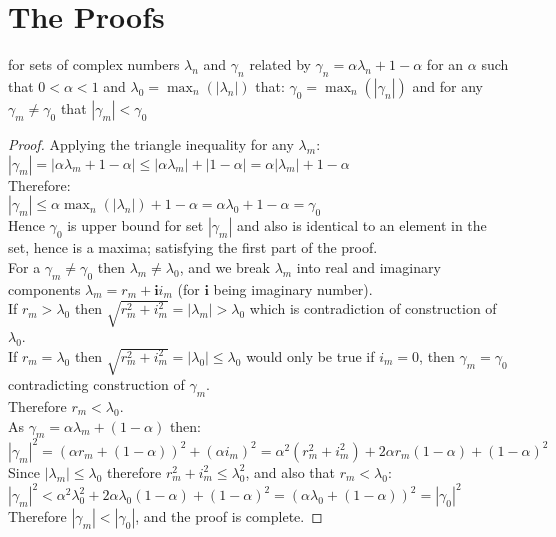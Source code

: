 \section{The Proofs}\label{appendix5b}

\begin{Lemma}\label{lem1}
for sets of complex numbers $\lambda_n$ and $\gamma_n$ related by $\gamma_n=\alpha\lambda_n+1-\alpha$ for an $\alpha$ such that $0<\alpha<1$ and $\lambda_0 = \max_n(|\lambda_n|)$ that: $\gamma_0=\max_n(|\gamma_n|)$ and for any $\gamma_m\ne\gamma_0$ that $|\gamma_m|<\gamma_0$ 
\end{Lemma}
\begin{proof}
Applying the triangle inequality for any $\lambda_m$:\\
$|\gamma_m|=|\alpha\lambda_m+1-\alpha|\le|\alpha\lambda_m|+|1-\alpha|=\alpha|\lambda_m|+1-\alpha$\\
Therefore:\\
$|\gamma_m|\le\alpha\max_n(|\lambda_n|)+1-\alpha=\alpha\lambda_0+1-\alpha=\gamma_0$\\
Hence $\gamma_0$ is upper bound for set $|\gamma_m|$ and also is identical to an element in the set, hence is a maxima; satisfying the first part of the proof.\\
For a $\gamma_m\ne\gamma_0$ then $\lambda_m\ne\lambda_0$, and we break $\lambda_m$ into real and imaginary components $\lambda_m=r_m+\mathbf{i}i_m$ (for $\mathbf{i}$ being imaginary number).\\
If $r_m>\lambda_0$ then $\sqrt{r^2_m+i^2_m}=|\lambda_m|>\lambda_0$ which is contradiction of construction of $\lambda_0$.\\
If $r_m=\lambda_0$ then $\sqrt{r^2_m+i^2_m}=|\lambda_0|\le\lambda_0$ would only be true if $i_m=0$, then $\gamma_m=\gamma_0$ contradicting construction of $\gamma_m$.\\
Therefore $r_m<\lambda_0$.\\
As $\gamma_m=\alpha\lambda_m+(1-\alpha)$ then:\\
$|\gamma_m|^2=(\alpha r_m+(1-\alpha))^2+(\alpha i_m)^2=\alpha^2(r_m^2+i_m^2)+2\alpha r_m(1-\alpha) + (1-\alpha)^2$\\
Since $|\lambda_m|\le\lambda_0$ therefore $r_m^2+i_m^2\le\lambda_0^2$, and also that $r_m<\lambda_0$:\\
$|\gamma_m|^2<\alpha^2\lambda_0^2+2\alpha \lambda_0(1-\alpha) + (1-\alpha)^2 = (\alpha\lambda_0 + (1-\alpha))^2=|\gamma_0|^2$\\
Therefore $|\gamma_m| < |\gamma_0|$, and the proof is complete.
\end{proof}




